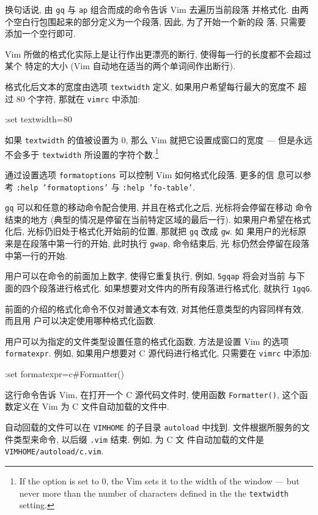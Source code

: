 换句话说, 由 \texttt{gq} 与 \texttt{ap} 组合而成的命令告诉 Vim 去遍历当前段落
并格式化. 由两个空白行包围起来的部分定义为一个段落, 因此, 为了开始一个新的段
落, 只需要添加一个空行即可.

Vim 所做的格式化实际上是让行作出更漂亮的断行, 使得每一行的长度都不会超过某个
特定的大小 (Vim 自动地在适当的两个单词间作出断行).

格式化后文本的宽度由选项 \texttt{textwidth} 定义, 如果用户希望每行最大的宽度不
超过 80 个字符, 那就在 \texttt{vimrc} 中添加:
\begin{vimcode}
:set textwidth=80
\end{vimcode}
如果 \texttt{textwidth} 的值被设置为 0, 那么 Vim 就把它设置成窗口的宽度 ---
但是永远不会多于 \texttt{textwidth} 所设置的字符个数.\footnote{If the option is
    set to 0, the Vim sets it to the width of the window --- but never more than
    the number of characters defined in the the \texttt{textwidth} setting.}

\begin{warning}
    通过设置选项 \texttt{formatoptions} 可以控制 Vim 如何格式化段落. 更多的信
    息可以参考 \texttt{:help 'formatoptions'} 与 \texttt{:help 'fo-table'}.
\end{warning}

\texttt{gq} 可以和任意的移动命令配合使用, 并且在格式化之后, 光标将会停留在移动
命令结束的地方 (典型的情况是停留在当前特定区域的最后一行). 如果用户希望在格式
化后, 光标仍旧处于格式化开始前的位置, 那就把 \texttt{gq} 改成 \texttt{gw}. 如
果用户的光标原来是在段落中第一行的开始, 此时执行 \texttt{gwap}, 命令结束后, 光
标仍然会停留在段落中第一行的开始.

用户可以在命令的前面加上数字, 使得它重复执行, 例如, \texttt{5gqap} 将会对当前
与下面的四个段落进行格式化. 如果想要对文件内的所有段落进行格式化, 就执行
\texttt{1gqG}.

前面的介绍的格式化命令不仅对普通文本有效, 对其他任意类型的内容同样有效, 而且用
户可以决定使用哪种格式化函数.

用户可以为指定的文件类型设置任意的格式化函数, 方法是设置 Vim 的选项
\texttt{formatexpr}. 例如, 如果用户想要对 C 源代码进行格式化, 只需要在
\texttt{vimrc} 中添加:
\begin{vimcode}
:set formatexpr=c#Formatter()
\end{vimcode}
这行命令告诉 Vim, 在打开一个 C 源代码文件时, 使用函数 \texttt{Formatter()},
这个函数定义在 Vim 为 C 文件自动加载的文件中.

\begin{warning}
    自动回载的文件可以在 \texttt{VIMHOME} 的子目录 \texttt{autoload} 中找到.
    文件根据所服务的文件类型来命令, 以后缀 \texttt{.vim} 结束. 例如, 为 C 文
    件自动加载的文件是 \texttt{VIMHOME/autoload/c.vim}.
\end{warning}

